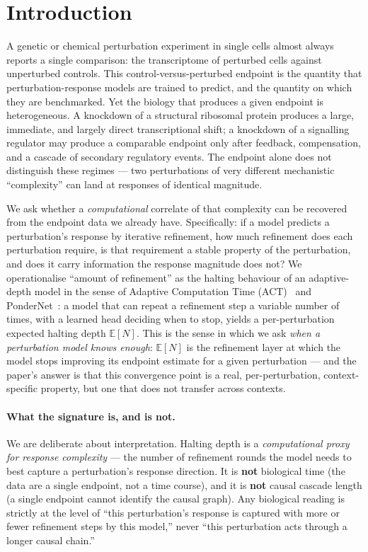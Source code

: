 \documentclass[11pt]{article}
\newcommand{\EN}{\ensuremath{\mathbb{E}[N]}}
\begin{document}
\section{Introduction}

A genetic or chemical perturbation experiment in single cells almost always reports a single
comparison: the transcriptome of perturbed cells against unperturbed controls. This
control-versus-perturbed endpoint is the quantity that perturbation-response models are trained
to predict, and the quantity on which they are benchmarked. Yet the biology that produces a
given endpoint is heterogeneous. A knockdown of a structural ribosomal protein produces a large,
immediate, and largely direct transcriptional shift; a knockdown of a signalling regulator may
produce a comparable endpoint only after feedback, compensation, and a cascade of secondary
regulatory events. The endpoint alone does not distinguish these regimes --- two perturbations of
very different mechanistic ``complexity'' can land at responses of identical magnitude.

We ask whether a \emph{computational} correlate of that complexity can be recovered from the
endpoint data we already have. Specifically: if a model predicts a perturbation's response by
iterative refinement, how much refinement does each perturbation require, is that requirement a
stable property of the perturbation, and does it carry information the response magnitude does
not? We operationalise ``amount of refinement'' as the halting behaviour of an adaptive-depth
model in the sense of Adaptive Computation Time (ACT)~\cite{graves2016} and
PonderNet~\cite{banino2021}: a model that can repeat a refinement step a variable number of
times, with a learned head deciding when to stop, yields a per-perturbation expected halting
depth \EN{}. This is the sense in which we ask \emph{when a perturbation model knows enough}: \EN{} is
the refinement layer at which the model stops improving its endpoint estimate for a given
perturbation --- and the paper's answer is that this convergence point is a real, per-perturbation,
context-specific property, but one that does not transfer across contexts.

\paragraph{What the signature is, and is not.} We are deliberate about interpretation. Halting
depth is a \emph{computational proxy for response complexity} --- the number of refinement rounds
the model needs to best capture a perturbation's response direction. It is
\textbf{not} biological time (the data are a single endpoint, not a time course), and it is
\textbf{not} causal cascade length (a single endpoint cannot identify the causal graph). Any
biological reading is strictly at the level of ``this perturbation's response is captured with
more or fewer refinement steps by this model,'' never ``this perturbation acts through a longer
causal chain.''
\end{document}
